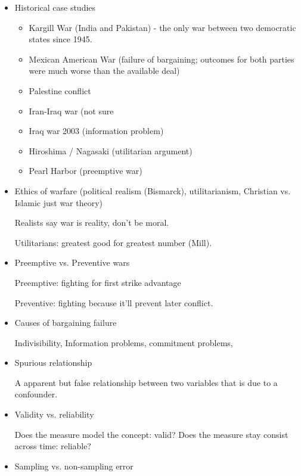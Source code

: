\documentclass{article}
\begin{document}
  \begin{itemize}
    \item Historical case studies
      \begin{itemize}
        \item Kargill War (India and Pakistan) - the only war between two democratic states since 1945.
        \item Mexican American War (failure of bargaining; outcomes for both parties were much worse than the available deal)
        \item Palestine conflict
        \item Iran-Iraq war (not sure \todo{)}
        \item Iraq war 2003 (information problem)
        \item Hiroshima / Nagasaki (utilitarian argument)
        \item Pearl Harbor (preemptive war)
      \end{itemize}

    \item Ethics of warfare (political realism (Bismarck), utilitarianism, Christian vs. Islamic just war theory)
      
      Realists say war is reality, don't be moral.

      Utilitarians: greatest good for greatest number (Mill).

    \item Preemptive vs. Preventive wars

      Preemptive: fighting for first strike advantage

      Preventive: fighting because it'll prevent later conflict.

    \item Causes of bargaining failure

      Indivisibility, Information problems, commitment problems, 

    \item Spurious relationship

      A apparent but false relationship between two variables that is due to a confounder.

    \item Validity vs. reliability

      Does the measure model the concept: valid? Does the measure stay consist across time: reliable?

    \item Sampling vs. non-sampling error


\end{itemize}
\end{document}
